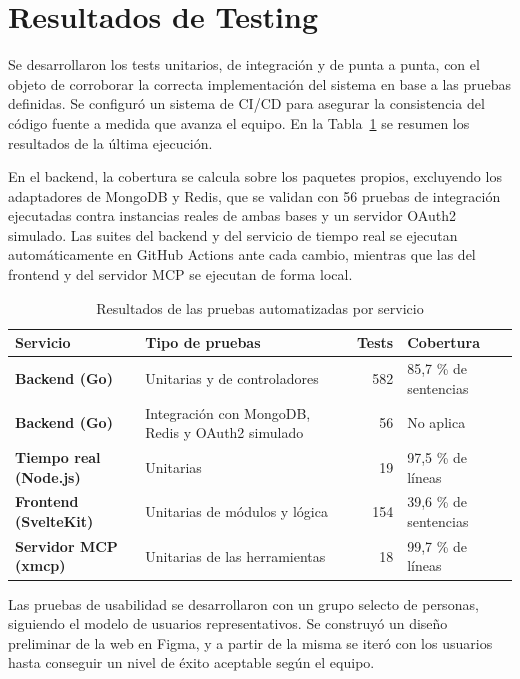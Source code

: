 \section{Resultados de Testing}
Se desarrollaron los tests unitarios, de integración y de punta a punta, con el objeto de corroborar la correcta implementación del sistema en base a las pruebas definidas. Se configuró un sistema de CI/CD para asegurar la consistencia del código fuente a medida que avanza el equipo. En la Tabla~\ref{tab:resultados_testing} se resumen los resultados de la última ejecución.

En el backend, la cobertura se calcula sobre los paquetes propios, excluyendo los adaptadores de MongoDB y Redis, que se validan con 56 pruebas de integración ejecutadas contra instancias reales de ambas bases y un servidor OAuth2 simulado. Las suites del backend y del servicio de tiempo real se ejecutan automáticamente en GitHub Actions ante cada cambio, mientras que las del frontend y del servidor MCP se ejecutan de forma local.

\begin{table}[H]
  \centering
  \renewcommand{\arraystretch}{1.2}
  \begin{tabularx}{\textwidth}{>{\bfseries}l X r l}
    \toprule
    Servicio & Tipo de pruebas & Tests & Cobertura \\
    \midrule
    Backend (Go) & Unitarias y de controladores & 582 & 85,7 \% de sentencias \\
    Backend (Go) & Integración con MongoDB, Redis y OAuth2 simulado & 56 & No aplica \\
    Tiempo real (Node.js) & Unitarias & 19 & 97,5 \% de líneas \\
    Frontend (SvelteKit) & Unitarias de módulos y lógica & 154 & 39,6 \% de sentencias \\
    Servidor MCP (xmcp) & Unitarias de las herramientas & 18 & 99,7 \% de líneas \\
    \bottomrule
  \end{tabularx}
  \caption{Resultados de las pruebas automatizadas por servicio}
  \label{tab:resultados_testing}
\end{table}

Las pruebas de usabilidad se desarrollaron con un grupo selecto de personas, siguiendo el modelo de usuarios representativos. Se construyó un diseño preliminar de la web en Figma, y a partir de la misma se iteró con los usuarios hasta conseguir un nivel de éxito aceptable según el equipo.

